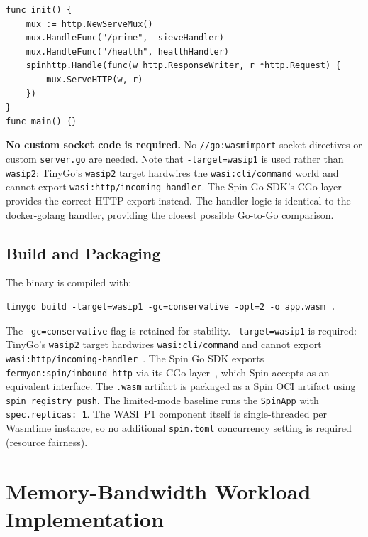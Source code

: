 \begin{verbatim}
func init() {
    mux := http.NewServeMux()
    mux.HandleFunc("/prime",  sieveHandler)
    mux.HandleFunc("/health", healthHandler)
    spinhttp.Handle(func(w http.ResponseWriter, r *http.Request) {
        mux.ServeHTTP(w, r)
    })
}
func main() {}
\end{verbatim}

\begin{sloppypar}
\textbf{No custom socket code is required.} No \texttt{//go:wasmimport} socket directives or custom \texttt{server.go} are needed. Note that \texttt{-target=wasip1} is used rather than \texttt{wasip2}: TinyGo's \texttt{wasip2} target hardwires the \texttt{wasi:cli/command} world and cannot export \texttt{wasi:http/incoming-handler}. The Spin Go \acs{SDK}'s \acs{CGo} layer provides the correct HTTP export instead. The handler logic is identical to the docker-golang handler, providing the closest possible Go-to-Go comparison.
\end{sloppypar}

\subsection{Build and Packaging}

The binary is compiled with:
\begin{verbatim}
tinygo build -target=wasip1 -gc=conservative -opt=2 -o app.wasm .
\end{verbatim}
\begin{sloppypar}
The \texttt{-gc=conservative} flag is retained for stability. \texttt{-target=wasip1} is required: TinyGo's \texttt{wasip2} target hardwires \texttt{wasi:cli/command} and cannot export \texttt{wasi:http/incoming-handler}~\cite{tinygo2024, bytecodealliance2024componentmodel}. The Spin Go \acs{SDK} exports \texttt{fermyon:spin/inbound-http} via its \acs{CGo} layer~\cite{spinframework2024go}, which Spin accepts as an equivalent interface. The \texttt{.wasm} artifact is packaged as a Spin \acs{OCI} artifact using \texttt{spin registry push}. The limited-mode baseline runs the \texttt{SpinApp} with \texttt{spec.replicas:~1}. The \acs{WASI}~P1 component itself is single-threaded per Wasmtime instance, so no additional \texttt{spin.toml} concurrency setting is required (resource fairness).
\end{sloppypar}

\section{Memory-Bandwidth Workload Implementation}
\label{sec:impl_membw}

